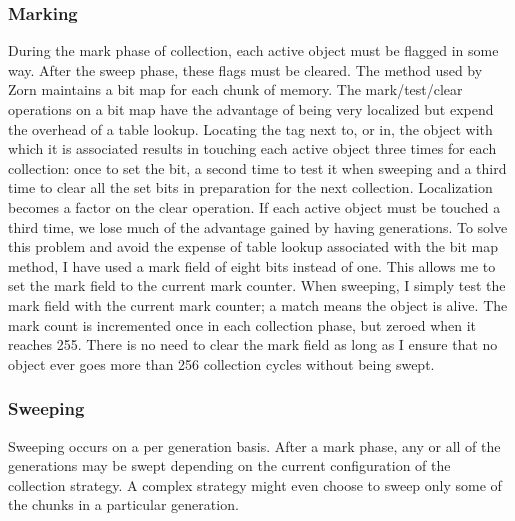 \subsubsection{Marking}

During the mark phase of collection, each active object must be
flagged in some way.  After the sweep phase, these flags must be
cleared.  The method used by Zorn \cite{Zorn90} maintains a bit map
for each chunk of memory.  The mark/test/clear operations on a bit map
have the advantage of being very localized but expend the overhead of
a table lookup.  Locating the tag next to, or in, the object with
which it is associated results in touching each active object three
times for each collection: once to set the bit, a second time to test
it when sweeping and a third time to clear all the set bits in
preparation for the next collection.  Localization becomes a factor on
the clear operation.  If each active object must be touched a third
time, we lose much of the advantage gained by having generations.  To
solve this problem and avoid the expense of table lookup associated
with the bit map method, I have used a mark field of eight bits
instead of one.  This allows me to set the mark field to the current
mark counter.  When sweeping, I simply test the mark field with the
current mark counter; a match means the object is alive.  The mark
count is incremented once in each collection phase, but zeroed when it
reaches 255.  There is no need to clear the mark field as long as I
ensure that no object ever goes more than 256 collection cycles
without being swept.


\subsubsection{Sweeping}

Sweeping occurs on a per generation basis.  After a mark phase, any or
all of the generations may be swept depending on the current
configuration of the collection strategy.  A complex strategy might
even choose to sweep only some of the chunks in a particular
generation.  

